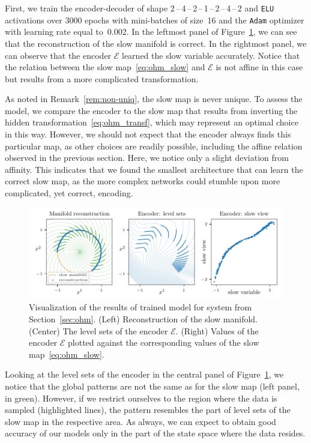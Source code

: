 \documentclass{article}
\newcommand{\enc}{\mathcal{E}} %
\begin{document}
First, we train the encoder-decoder of shape 2\,--\,4\,--\,2\,--\,1\,--\,2\,--\,4\,--\,2 and \texttt{ELU} activations over 3000 epochs with mini-batches of size~16 and the \texttt{Adam} optimizer with learning rate equal to~0.002. In the leftmost panel of Figure~\ref{fig:cresc2d_recon_fibers}, we can see that the reconstruction of the slow manifold is correct. In the rightmost panel, we can observe that the encoder $\enc$ learned the slow variable accurately. Notice that the relation between the slow map~\eqref{eq:ohm_slow} and $\enc$ is not affine in this case but results from a more complicated transformation.

As noted in Remark~\ref{rem:non-uniq}, the slow map is never unique. To assess the model, we compare the encoder to the slow map that results from inverting the hidden transformation~\eqref{eq:ohm_transf}, which may represent an optimal choice in this way. However, we should not expect that the encoder always finds this particular map, as other choices are readily possible, including the affine relation observed in the previous section. Here, we notice only a slight deviation from affinity. This indicates that we found the smallest architecture that can learn the correct slow map, as the more complex networks could stumble upon more complicated, yet correct, encoding.

\begin{figure}
    \centering
    \includegraphics[width=\textwidth]{figs/cresc2d_recon_fibers.pdf}
    \caption{Visualization of the results of trained model for system from Section~\ref{sec:ohm}. (Left) Reconstruction of the slow manifold. (Center) The level sets of the encoder $\enc$. (Right) Values of the encoder $\enc$ plotted against the corresponding values of the slow map~\eqref{eq:ohm_slow}.}
    \label{fig:cresc2d_recon_fibers}
\end{figure}

Looking at the level sets of the encoder in the central panel of Figure~\ref{fig:cresc2d_recon_fibers}, we notice that the global patterns are not the same as for the slow map (left panel, in green). However, if we restrict ourselves to the region where the data is sampled (highlighted lines), the pattern resembles the part of level sets of the slow map in the respective area. As always, we can expect to obtain good accuracy of our models only in the part of the state space where the data resides.
\end{document}

